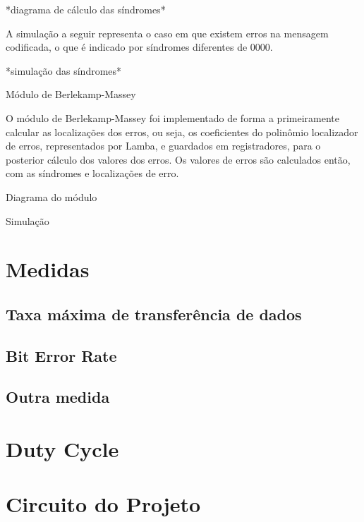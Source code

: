 	*diagrama de cálculo das síndromes*
	
	A simulação a seguir representa o caso em que existem erros na mensagem codificada, o que é indicado por síndromes diferentes de 0000.
	
	*simulação das síndromes*
	
	Módulo de Berlekamp-Massey
	
	O módulo de Berlekamp-Massey foi implementado de forma a primeiramente calcular as localizações dos erros, ou seja, os coeficientes do polinômio localizador de erros, representados por Lamba, e guardados em registradores, para o posterior cálculo dos valores dos erros. Os valores de erros são calculados então, com as síndromes e localizações de erro.
	
	Diagrama do módulo
	
	Simulação
	
	 
	
	
	
	
	
	\section{Medidas}
	
	\subsection{Taxa máxima de transferência de dados}
	
	\subsection{Bit Error Rate}
	
	\subsection{Outra medida}
	
	\section{Duty Cycle}
	
	\section{Circuito do Projeto}
